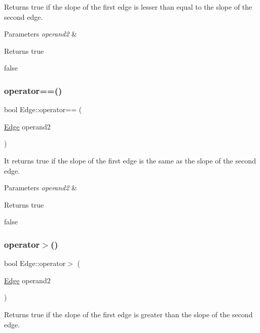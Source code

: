 Returns true if the slope of the first edge is lesser than equal to the slope of the second edge. 


\begin{DoxyParams}{Parameters}
{\em operand2} & \\
\hline
\end{DoxyParams}
\begin{DoxyReturn}{Returns}
true 

false 
\end{DoxyReturn}
\mbox{\label{classEdge_a5e7b6b77b9afb78e404a9718ecd815fd}} 
\subsubsection{\texorpdfstring{operator==()}{operator==()}}
{\footnotesize\ttfamily bool Edge\+::operator== (\begin{DoxyParamCaption}\item[{\hyperlink{classEdge}{Edge}}]{operand2 }\end{DoxyParamCaption})}



It returns true if the slope of the first edge is the same as the slope of the second edge. 


\begin{DoxyParams}{Parameters}
{\em operand2} & \\
\hline
\end{DoxyParams}
\begin{DoxyReturn}{Returns}
true 

false 
\end{DoxyReturn}
\mbox{\label{classEdge_afaac3a288de3d535492c88e3b38c1106}} 
\subsubsection{\texorpdfstring{operator$>$()}{operator>()}}
{\footnotesize\ttfamily bool Edge\+::operator$>$ (\begin{DoxyParamCaption}\item[{\hyperlink{classEdge}{Edge}}]{operand2 }\end{DoxyParamCaption})}



Returns true if the slope of the first edge is greater than the slope of the second edge. 


